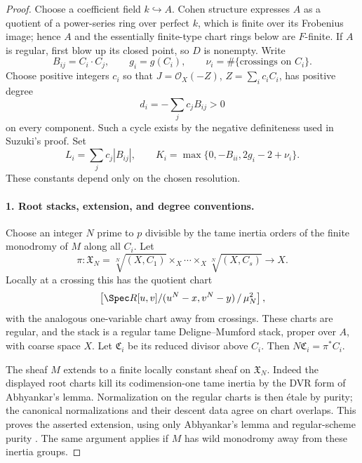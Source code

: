 \begin{proof}
Choose a coefficient field $k\hookrightarrow A$. Cohen structure
expresses $A$ as a quotient of a power-series ring over perfect $k$,
which is finite over its Frobenius image; hence $A$ and the
essentially finite-type chart rings below are $F$-finite. If $A$ is regular, first blow up its closed point,
so $D$ is nonempty. Write
\[
 B_{ij}=C_i\cdot C_j,\qquad g_i=g(C_i),\qquad
 \nu_i=\#\{\text{crossings on }C_i\}.
\]
Choose positive integers $c_i$ so that
$J=\mathcal O_X(-Z)$, $Z=\sum_i c_iC_i$, has positive degree
\[
 d_i=-\sum_jc_j B_{ij}>0
\]
on every component. Such a cycle exists by the negative definiteness
used in Suzuki's proof. Set
\[
 L_i=\sum_jc_j|B_{ij}|,\qquad
 K_i=\max\{0,-B_{ii},2g_i-2+\nu_i\}.
 \tag{F8.1}
\]
These constants depend only on the chosen resolution.

\paragraph{1. Root stacks, extension, and degree conventions.}
Choose an integer $N$ prime to $p$ divisible by the tame inertia
orders of the finite monodromy of $M$ along all $C_i$. Let
\[
 \pi:\mathfrak X_N=\sqrt[N]{(X,C_1)}\mathbin{\times_X}\cdots
                 \mathbin{\times_X}\sqrt[N]{(X,C_s)}\longrightarrow X.
\]
Locally at a crossing this has the quotient chart
\[
 \left[\Spec R[u,v]/(u^N-x,v^N-y)\,/\,\mu_N^2\right],
\]
with the analogous one-variable chart away from crossings.
These charts are regular, and the stack is a regular tame
Deligne--Mumford stack, proper over $A$, with coarse space $X$.
Let $\mathfrak C_i$ be its reduced divisor above $C_i$. Then
$N\mathfrak C_i=\pi^*C_i$.

The sheaf $M$ extends to a finite locally constant sheaf on
$\mathfrak X_N$. Indeed the displayed root charts kill its
codimension-one tame inertia by the DVR form of Abhyankar's lemma.
Normalization on the regular charts is then \'etale by purity;
the canonical normalizations and their descent data agree on
chart overlaps. This proves the asserted extension, using only
Abhyankar's lemma and regular-scheme purity
\cite[tags 0BRM and 0BMB]{StacksAbhyankar,StacksBranchPurity}.
The same argument applies if $M$ has wild monodromy away from
these inertia groups.


\end{proof}
